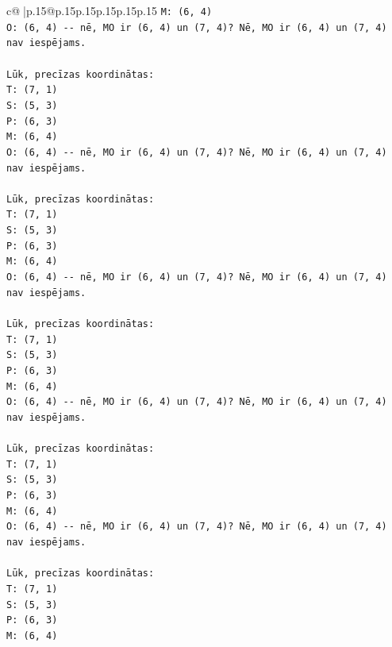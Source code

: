 \documentclass{article}
\begin{document}
{\begin{supertabular}{c@{$\;$}|p{.15\linewidth}@{}p{.15\linewidth}p{.15\linewidth}p{.15\linewidth}p{.15\linewidth}p{.15\linewidth}}
{{{\texttt{M: (6, 4)} \\
\texttt{O: (6, 4) {-}{-} nē, MO ir (6, 4) un (7, 4)? Nē, MO ir (6, 4) un (7, 4) nav iespējams.} \\
\\ 
\texttt{Lūk, precīzas koordinātas:} \\
\texttt{T: (7, 1)} \\
\texttt{S: (5, 3)} \\
\texttt{P: (6, 3)} \\
\texttt{M: (6, 4)} \\
\texttt{O: (6, 4) {-}{-} nē, MO ir (6, 4) un (7, 4)? Nē, MO ir (6, 4) un (7, 4) nav iespējams.} \\
\\ 
\texttt{Lūk, precīzas koordinātas:} \\
\texttt{T: (7, 1)} \\
\texttt{S: (5, 3)} \\
\texttt{P: (6, 3)} \\
\texttt{M: (6, 4)} \\
\texttt{O: (6, 4) {-}{-} nē, MO ir (6, 4) un (7, 4)? Nē, MO ir (6, 4) un (7, 4) nav iespējams.} \\
\\ 
\texttt{Lūk, precīzas koordinātas:} \\
\texttt{T: (7, 1)} \\
\texttt{S: (5, 3)} \\
\texttt{P: (6, 3)} \\
\texttt{M: (6, 4)} \\
\texttt{O: (6, 4) {-}{-} nē, MO ir (6, 4) un (7, 4)? Nē, MO ir (6, 4) un (7, 4) nav iespējams.} \\
\\ 
\texttt{Lūk, precīzas koordinātas:} \\
\texttt{T: (7, 1)} \\
\texttt{S: (5, 3)} \\
\texttt{P: (6, 3)} \\
\texttt{M: (6, 4)} \\
\texttt{O: (6, 4) {-}{-} nē, MO ir (6, 4) un (7, 4)? Nē, MO ir (6, 4) un (7, 4) nav iespējams.} \\
\\ 
\texttt{Lūk, precīzas koordinātas:} \\
\texttt{T: (7, 1)} \\
\texttt{S: (5, 3)} \\
\texttt{P: (6, 3)} \\
\texttt{M: (6, 4)} \\
}}}
\end{supertabular}}
\end{document}
